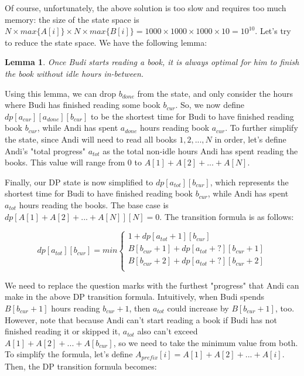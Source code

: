 \documentclass[12pt]{article}
\newtheorem{lemma}{Lemma}
\begin{document}
Of course, unfortunately, the above solution is too slow and requires too much memory: the size of the state space is $N \times max\{A[i]\} \times N \times max\{B[i]\} = 1000 \times 1000 \times 1000 \times 10 = 10^{10}$. Let's try to reduce the state space. We have the following lemma:

\begin{lemma}
  Once Budi starts reading a book, it is always optimal for him to finish the book without idle hours in-between.
\end{lemma}

Using this lemma, we can drop $b_{done}$ from the state, and only consider the hours where Budi has finished reading some book $b_{cur}$. So, we now define $dp[a_{cur}][a_{done}][b_{cur}]$ to be the shortest time for Budi to have finished reading book $b_{cur}$, while Andi has spent $a_{done}$ hours reading book $a_{cur}$. To further simplify the state, since Andi will need to read all books $1, 2, ..., N$ in order, let's define Andi's "total progress" $a_{tot}$ as the total non-idle hours Andi has spent reading the books. This value will range from $0$ to $A[1] + A[2] + ... + A[N]$.

Finally, our DP state is now simplified to $dp[a_{tot}][b_{cur}]$, which represents the shortest time for Budi to have finished reading book $b_{cur}$, while Andi has spent $a_{tot}$ hours reading the books. The base case is $dp[A[1] + A[2] + ... + A[N]][N] = 0$. The transition formula is as follows:

\[
dp[a_{tot}][b_{cur}] = min 
\begin{cases}
  1 + dp[a_{tot}+1][b_{cur}] \\
  B[b_{cur}+1] + dp[a_{tot}+?][b_{cur}+1] \\
  B[b_{cur}+2] + dp[a_{tot}+?][b_{cur}+2] \\
\end{cases}
\]


We need to replace the question marks with the furthest "progress" that Andi can make in the above DP transition formula. Intuitively, when Budi spends $B[b_{cur}+1]$ hours reading $b_{cur}+1$, then $a_{tot}$ could increase by $B[b_{cur}+1]$, too.  However, note that because Andi can't start reading a book if Budi has not finished reading it or skipped it,  $a_{tot}$ also can't exceed $A[1] + A[2] + ... + A[b_{cur}]$, so we need to take the minimum value from both. To simplify the formula, let's define $A_{prefix}[i] = A[1] + A[2] + ... + A[i]$. Then, the DP transition formula becomes:
\end{document}
